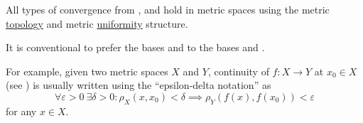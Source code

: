 \begin{remark}\label{remark:metric_space_convergence}
  All types of convergence from ,  and  hold in metric spaces using the metric \hyperref[def:metric_topology]{topology} and metric \hyperref[def:metric_uniformity]{uniformity} structure.

  It is conventional to prefer the bases  and  to the bases  and .

  For example, given two metric spaces \( X \) and \( Y \), continuity of \( f: X \to Y \) at \( x_0 \in X \) (see ) is usually written using the \enquote{epsilon-delta notation} as
  \begin{equation*}
    \forall \varepsilon > 0 \ \exists \delta > 0 : \rho_X(x, x_0) < \delta \implies \rho_Y(f(x), f(x_0)) < \varepsilon
  \end{equation*}
  for any \( x \in X \).
\end{remark}
